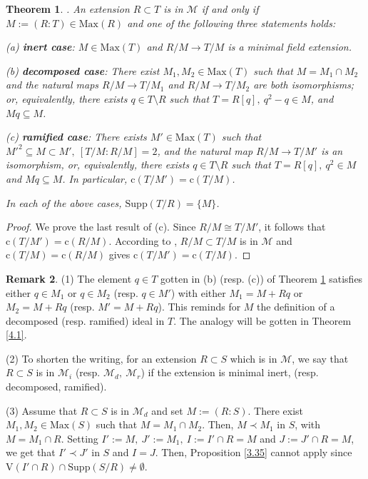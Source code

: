 \documentclass[12pt,leqno]{amsart}
\newtheorem{theorem}{Theorem}[section]
\theoremstyle{definition}
\newtheorem{remark}[theorem]{Remark}
\begin{document}
\begin{theorem}\label{minimal+} \cite [Theorems 2.1, 2.2 and 2.3]{DPP2}. An extension $R\subset T$ is in $\mathcal M$ if and only if $M:=(R:T)\in\mathrm{Max}(R)$ and one of the following three statements holds:

\noindent (a) {\bf inert case}: $M\in\mathrm{Max}(T)$ and $R/M\to T/M$ is a minimal field extension.

\noindent (b) {\bf decomposed case}: There exist $M_1,M_2\in\mathrm {Max}(T)$ such that $M=M_1\cap M_2$ and the natural maps $R/M\to T/M _1$ and $R/M\to T/M_2$ are both isomorphisms; or, equivalently, there exists $q\in T\setminus R$ such that $T=R[q],\ q^2-q\in M$, and $Mq\subseteq M$.

\noindent (c) {\bf ramified case}: There exists $M'\in\mathrm{Max}(T)$ such that ${M'}^2\subseteq M\subset M',\ [T/M:R/M]=2$, and the natural map $ R/M\to T/M'$ is an isomorphism, or, equivalently, there exists $q\in T\setminus R$ such that $T=R[q],\ q^2\in M$ and $Mq\subseteq M$.
 In particular, $\mathrm{c}(T/M')=\mathrm{c}(T/M)$.

In each of the above cases, $\mathrm{Supp}(T/R)=\{M\}$.
\end{theorem}

\begin{proof} We prove the last result of (c). Since $R/M\cong T/M'$, it follows that $\mathrm{c}(T/M')=\mathrm{c}(R/M)$. According to \cite[Proposition 4.7]{DPPS}, $R/M\subset T/M$ is in $\mathcal M$ and $\mathrm{c}(T/M)=\mathrm{c}(R/M)$ gives $\mathrm{c}(T/M')=\mathrm{c}(T/M)$.
\end{proof}

\begin{remark}\label{4.01}(1) The element $q\in T$ gotten in (b) (resp. (c)) of Theorem \ref{minimal+} satisfies either $q\in M_1$ or $q\in M_2$ (resp. $q\in M'$) with either $M_1=M+Rq$ or $M_2=M+Rq$ (resp. $ M'=M+Rq$). This reminds for $M$ the definition of a decomposed (resp. ramified) ideal in $T$. The analogy will be gotten in Theorem \ref{4.1}.

(2) To shorten the writing, for an extension $R\subset S$ which is in $\mathcal M$, we say that $R\subset S$ is in $\mathcal M_i$  (resp. $\mathcal M_d,\ \mathcal M_r$) if the extension is minimal inert, (resp. decomposed, ramified).

(3) Assume that $R\subset S$ is in $\mathcal M_d$ and set $M:=(R:S)$. There exist $M_1,M_2\in\mathrm{Max}(S)$ such that $M=M_1\cap M_2 $. Then, $M\prec M_1$ in $S$, with $M=M_1\cap R$. Setting $I':=M,\ J':= M_1,\ I:=I'\cap R=M$ and $J:=J'\cap R=M$, we get that $I'\prec J'$ in $S$
 and $I=J$. Then, Proposition \ref{3.35} cannot apply since $\mathrm{V}(I' \cap R )\cap\mathrm{Supp}(S/R)\neq\emptyset$.
\end{remark}
 
\end{document}
